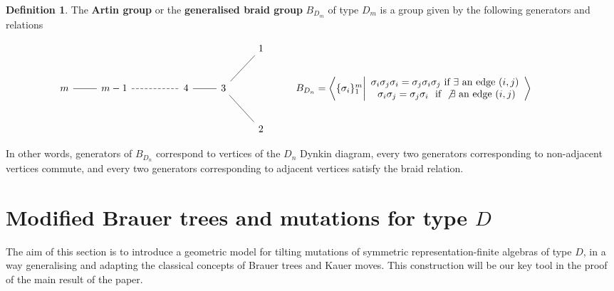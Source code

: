 \documentclass[12pt]{amsart}
\theoremstyle{plain}
\theoremstyle{remark}
\theoremstyle{definition}
\newtheorem{definition}{Definition}[section]
\begin{document}
\begin{definition}\label{def:braid} The {\bf Artin group} or the {\bf generalised braid group} $B_{D_m}$ of type $D_m$ is a group given by the following generators and relations

\[\begin{tikzcd}
	&&&&& {\small{1}} \\
	{\small{m}} & {\small{m-1}} && {\small{4}} & {\small{3}} && { B_{D_n} = \bigg\langle \{\sigma_i\}_1^m \bigg| \begin{array}{c} \sigma_i \sigma_{j} \sigma_i = \sigma_{j} \sigma_i \sigma_{j} \text{ if } \exists \text{ an edge } (i,j) \\ \  \sigma_i\sigma_j = \sigma_j\sigma_i \ \text{ if } \not\exists \text{ an edge } (i,j) \end{array} \bigg\rangle  } & {} \\
	&&&&& {\small{2}}
	\arrow[no head, from=2-1, to=2-2]
	\arrow[no head, from=2-5, to=1-6]
	\arrow[no head, from=2-5, to=3-6]
	\arrow[no head, from=2-4, to=2-5]
	\arrow[dashed, no head, from=2-2, to=2-4]
\end{tikzcd}\]

 
 In other words, generators of $B_{D_n}$ correspond to vertices of the $D_n$ Dynkin diagram, every two generators corresponding to non-adjacent vertices commute, and every two generators corresponding to adjacent vertices satisfy the braid relation. 
\end{definition}

\section{Modified Brauer trees and mutations for type \texorpdfstring{$D$}{Lg}}\label{sec:mutmodel}
The aim of this section is to introduce a geometric model for tilting mutations of symmetric representation-finite algebras of type $D$, in a way generalising and adapting the classical concepts of Brauer trees and Kauer moves. This construction will be our key tool in the proof of the main result of the paper.  
\end{document}

